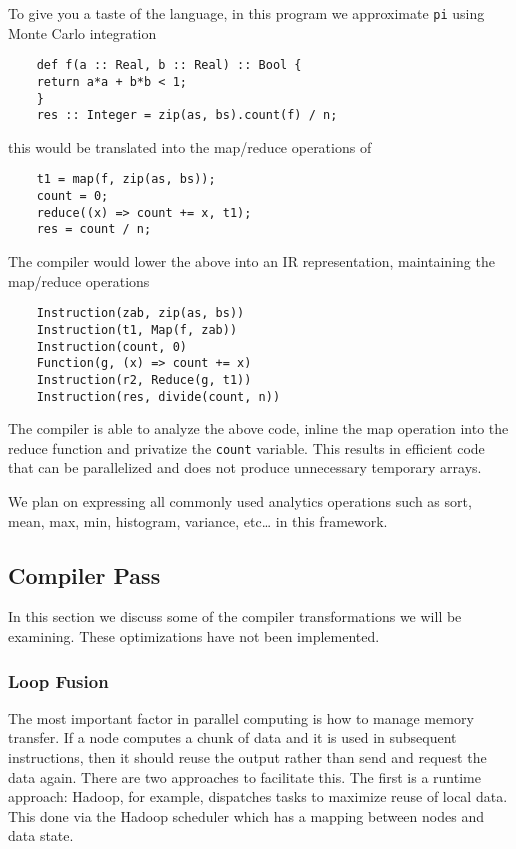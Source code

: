 To give you a taste of the language, in this program we approximate
\texttt{pi} using Monte Carlo integration

\begin{verbatim}
    def f(a :: Real, b :: Real) :: Bool {
    return a*a + b*b < 1;
    }
    res :: Integer = zip(as, bs).count(f) / n;
\end{verbatim}

this would be translated into the map/reduce operations of

\begin{verbatim}
    t1 = map(f, zip(as, bs));
    count = 0;
    reduce((x) => count += x, t1);
    res = count / n;
\end{verbatim}

The compiler would lower the above into an IR representation,
maintaining the map/reduce operations

\begin{verbatim}
    Instruction(zab, zip(as, bs))
    Instruction(t1, Map(f, zab))
    Instruction(count, 0)
    Function(g, (x) => count += x)
    Instruction(r2, Reduce(g, t1))
    Instruction(res, divide(count, n))
\end{verbatim}

The compiler is able to analyze the above code, inline the map operation
into the reduce function and privatize the \texttt{count} variable. This
results in efficient code that can be parallelized and does not produce
unnecessary temporary arrays.

We plan on expressing all commonly used analytics operations such as
sort, mean, max, min, histogram, variance, etc\ldots{} in this
framework.

\subsection{Compiler Pass}\label{compiler-pass}

In this section we discuss some of the compiler transformations we will
be examining. These optimizations have not been implemented.

\subsubsection{Loop Fusion}\label{loop-fusion}

The most important factor in parallel computing is how to manage memory
transfer. If a node computes a chunk of data and it is used in
subsequent instructions, then it should reuse the output rather than
send and request the data again. There are two approaches to facilitate
this. The first is a runtime approach: Hadoop, for example, dispatches
tasks to maximize reuse of local data. This done via the Hadoop
scheduler which has a mapping between nodes and data state.

